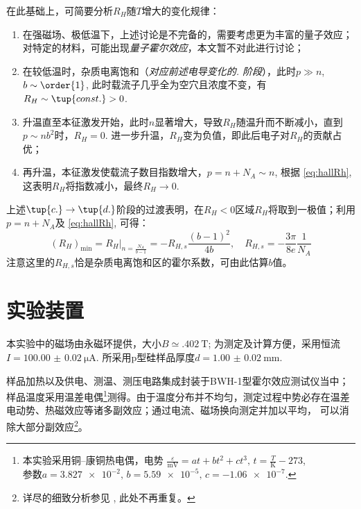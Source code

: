 \documentclass[aps,pre,12pt,preprint,%
	onecolumn,showpacs,showkeys,nofootinbib]{revtex4-1}
\begin{document}
	在此基础上，可简要分析$R_H$随$T$增大的变化规律：
	\begin{enumerate}
	\item 在强磁场、极低温下，上述讨论是不完备的，需要考虑更为丰富的量子效应；对特定的材料，可能出现\textit{量子霍尔效应}，本文暂不对此进行讨论；
	\item 在较低温时，杂质电离饱和（\textit{对应前述电导变化的. 阶段}），此时$p\gg n$, $b\sim\order{1}$, 此时载流子几乎全为空穴且浓度不变，有$R_H \sim \tup{const.} > 0$. 
	\item 升温直至本征激发开始，此时$n$显著增大，导致$R_H$随温升而不断减小，直到$p\sim nb^2$时，$R_H = 0$. 进一步升温，$R_H$变为负值，即此后电子对$R_H$的贡献占优；
	\item 再升温，本征激发使载流子数目指数增大，$p = n + N_A \sim n$, 根据 \eqref{eq:hallRh}, 这表明$R_H$将指数减小，最终$R_H \to 0$. 
	\end{enumerate}
	
	上述$\tup{c.}\to\tup{d.}$阶段的过渡表明，在$R_H < 0$区域$R_H$将取到一极值；利用$p = n + N_A$及 \eqref{eq:hallRh}, 可得：
	\begin{equation}
		(R_H)_{\min}
		= R_H\Big|_{n = \frac{N_A}{b-1}}
		= -R_{H,s} \frac{(b-1)^2}{4b},\quad
		R_{H,s} = - \frac{3\pi}{8e} \frac{1}{N_A}
		\label{eq:bValueEstimated}
	\end{equation}
	注意这里的$R_{H,s}$恰是杂质电离饱和区的霍尔系数，可由此估算$b$值。
\section{实验装置}
	本实验中的磁场由永磁环提供，大小$B \simeq \SI{.402}{\tesla}$; 为测定及计算方便，采用恒流$I = \SI{100.00(2)}{\uA}$. 所采用p型硅样品厚度$d = \SI{1.00(2)}{\mm}$. 
	
	样品加热以及供电、测温、测压电路集成封装于BWH-1型霍尔效应测试仪当中；样品温度采用温差电偶\footnote{%
		本实验采用铜--康铜热电偶，电势
		$\frac{\varepsilon}{\si{\mV}}
			= at + bt^2 + ct^3,\,
			t = \frac{T}{\si{\kelvin}} - 273$, \\
		参数$a = \num{3.827e-2},\,
			b = \num{5.59e-5},\,
			c = \num{-1.06e-7}$. 
	}测得。由于温度分布并不均匀，测定过程中势必存在温差电动势、热磁效应等诸多副效应；通过电流、磁场换向测定并加以平均，
	可以消除大部分副效应\footnote{%
		详尽的细致分析参见 \cite{textbook}, 此处不再重复。
	}。
	
\end{document}
